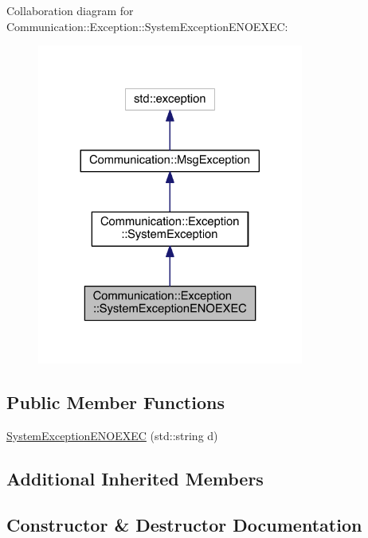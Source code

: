 Collaboration diagram for Communication\+:\+:Exception\+:\+:System\+Exception\+E\+N\+O\+E\+X\+E\+C\+:\nopagebreak
\begin{figure}[H]
\begin{center}
\leavevmode
\includegraphics[width=248pt]{class_communication_1_1_exception_1_1_system_exception_e_n_o_e_x_e_c__coll__graph}
\end{center}
\end{figure}
\subsection*{Public Member Functions}
\begin{DoxyCompactItemize}
\item 
\hyperlink{class_communication_1_1_exception_1_1_system_exception_e_n_o_e_x_e_c_ad16cbed9ead6bb1d4fb3f6f07c25941c}{System\+Exception\+E\+N\+O\+E\+X\+E\+C} (std\+::string d)
\end{DoxyCompactItemize}
\subsection*{Additional Inherited Members}


\subsection{Constructor \& Destructor Documentation}
\hypertarget{class_communication_1_1_exception_1_1_system_exception_e_n_o_e_x_e_c_ad16cbed9ead6bb1d4fb3f6f07c25941c}{}
